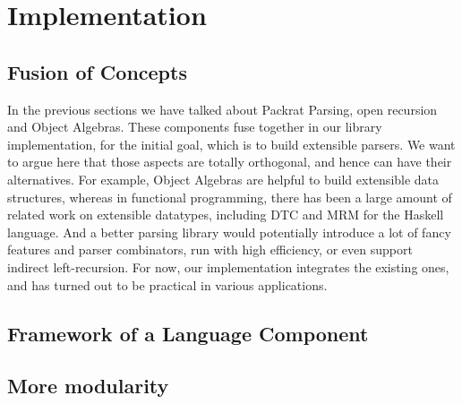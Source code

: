 \section{Implementation}\label{sec:implementation}

\subsection{Fusion of Concepts}\label{subsec:fusion}

In the previous sections we have talked about Packrat Parsing, open recursion and Object Algebras. These components fuse together in our library implementation, for the initial goal, which is to build extensible parsers. We want to argue here that those aspects are totally orthogonal, and hence can have their alternatives. For example, Object Algebras are helpful to build extensible data structures, whereas in functional programming, there has been a large amount of related work on extensible datatypes, including DTC and MRM for the Haskell language. And a better
parsing library would potentially introduce a lot of fancy features and parser combinators, run with high efficiency, or even support indirect left-recursion. 
 For now, our implementation integrates the existing ones, and has turned out to be practical in various applications.

\subsection{Framework of a Language Component}\label{subsec:framework}

\subsection{More modularity}
